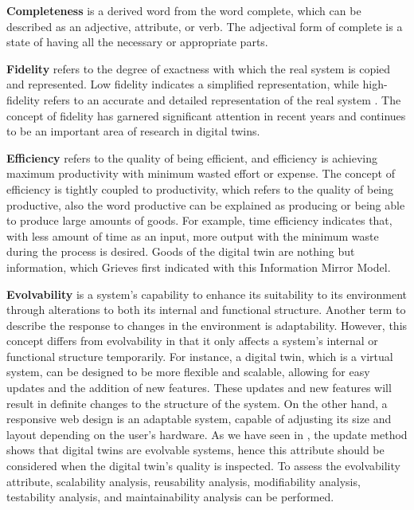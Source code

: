 \documentclass{llncs}
\begin{document}
    \textbf{Completeness} is a derived word from the word complete, which can be described as an adjective, attribute, or verb\cite{OxfordDictionary}. 
    The adjectival form of complete is a state of having all the necessary or appropriate parts\cite{OxfordDictionary}.

    \textbf{Fidelity} refers to the degree of exactness with which the real system is copied and represented. Low fidelity indicates a simplified representation, 
    while high-fidelity refers to an accurate and detailed representation of the real system \cite{Review2}. 
    The concept of fidelity has garnered significant attention in recent years and continues to be an important area of research in digital twins\cite{Review2}\cite{Review1}.

    \textbf{Efficiency} refers to the quality of being efficient, and efficiency is achieving
    maximum productivity with minimum wasted effort or expense. The concept of efficiency is tightly coupled to productivity, which refers to the quality of being productive,
    also the word productive can be explained as producing or being able to produce large amounts of goods\cite{OxfordDictionary}.  
    For example, time efficiency indicates that,  with less amount of time as an input, more output with the minimum 
    waste during the process is desired. Goods of the digital twin are nothing but information, which Grieves first 
    indicated with this Information Mirror Model\cite{GrievesPLMBook}.

    \textbf{Evolvability} is a system's capability to enhance its suitability to its environment through alterations to both its internal and functional 
    structure\cite{MobusSystemTheory}. Another term to describe the response to changes in the environment is adaptability.
    However, this concept differs from evolvability in that it only affects a system's internal or functional structure temporarily. 
    For instance, a digital twin, which is a virtual system, can be designed to be more flexible and scalable, 
    allowing for easy updates and the addition of new features. 
    These updates and new features will result in definite changes to the structure of the system. 
    On the other hand, a responsive web design is an adaptable system, capable of adjusting its size and layout 
    depending on the user's hardware. As we have seen in \cite{ZHANGUPDATEMETHOD}, the update method shows that digital twins are evolvable systems, 
    hence this attribute should be considered when the digital twin's quality is inspected. To assess the evolvability attribute, scalability analysis,
    reusability analysis, modifiability analysis, testability analysis, and maintainability analysis can be performed. 
\end{document}
